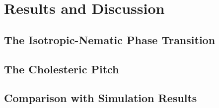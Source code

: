 
\chapter{Results and Discussion}

\section{The Isotropic-Nematic Phase Transition}

\section{The Cholesteric Pitch}

\section{Comparison with Simulation Results}

